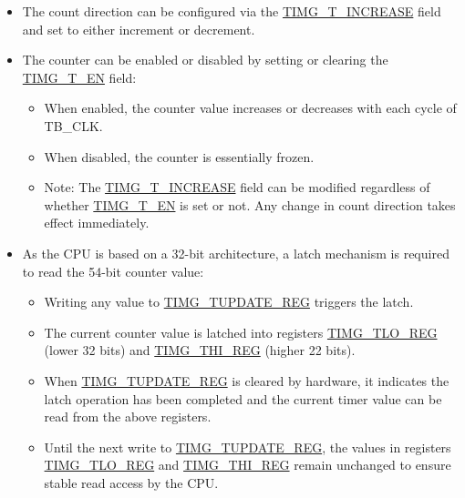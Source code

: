 \documentclass[main\_\_EN.tex]{subfiles}
\begin{document}
\begin{itemize}
    \item The count direction can be configured via the \hyperref[fielddesc:TIMGTXINCREASE]{TIMG\_T\_INCREASE} field and set to either increment or decrement.
    \item The counter can be enabled or disabled by setting or clearing the \hyperref[fielddesc:TIMGTXEN]{TIMG\_T\_EN} field:

    \begin{itemize}
        \item When enabled, the counter value increases or decreases with each cycle of TB\_CLK.
        \item When disabled, the counter is essentially frozen.
        \item Note: The \hyperref[fielddesc:TIMGTXINCREASE]{TIMG\_T\_INCREASE} field can be modified regardless of whether \hyperref[fielddesc:TIMGTXEN]{TIMG\_T\_EN} is set or not. Any change in count direction takes effect immediately.
    \end{itemize}

    \item As the CPU is based on a 32-bit architecture, a latch mechanism is required to read the 54-bit counter value:

    \begin{itemize}
        \item Writing any value to \hyperref[regdesc:TIMGTXUPDATEREG]{TIMG\_TUPDATE\_REG} triggers the latch.
        \item The current counter value is latched into registers \hyperref[regdesc:TIMGTXLOREG]{TIMG\_TLO\_REG} (lower 32 bits) and \hyperref[regdesc:TIMGTXHIREG]{TIMG\_THI\_REG} (higher 22 bits).
        \item When \hyperref[regdesc:TIMGTXUPDATEREG]{TIMG\_TUPDATE\_REG} is cleared by hardware, it indicates the latch operation has been completed and the current timer value can be read from the above registers.
        \item  Until the next write to \hyperref[regdesc:TIMGTXUPDATEREG]{TIMG\_TUPDATE\_REG}, the values in registers \hyperref[regdesc:TIMGTXLOREG]{TIMG\_TLO\_REG} and \hyperref[regdesc:TIMGTXHIREG]{TIMG\_THI\_REG} remain unchanged to ensure stable read access by the CPU.
    \end{itemize}

\end{itemize}
\end{document}
